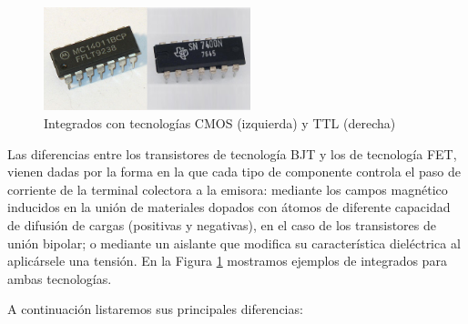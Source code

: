 \documentclass[a4paper]{article}
\begin{document}
\begin{figure}[h]\centering
    \includegraphics[height=3cm]{transistores.png}
    \caption{Integrados con tecnologías CMOS (izquierda) y TTL 
    (derecha)}\label{fig:transistores}
\end{figure}

Las diferencias entre los transistores de tecnología BJT y los de 
tecnología FET, vienen dadas por la forma en la que cada tipo de 
componente controla el paso de corriente de la terminal colectora a 
la emisora: mediante los campos magnético inducidos en la unión de 
materiales dopados con átomos de diferente capacidad de difusión
de cargas (positivas y negativas), en el caso de los transistores de
unión bipolar; o mediante un aislante que modifica su característica
dieléctrica al aplicársele una tensión. En la Figura 
\ref{fig:transistores} mostramos ejemplos de integrados para ambas 
tecnologías.

A continuación listaremos sus principales diferencias:
\end{document}
